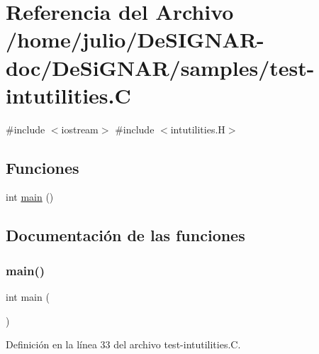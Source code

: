 \hypertarget{test-intutilities_8_c}{}\section{Referencia del Archivo /home/julio/\+De\+S\+I\+G\+N\+A\+R-\/doc/\+De\+Si\+G\+N\+A\+R/samples/test-\/intutilities.C}
\label{test-intutilities_8_c}
{\ttfamily \#include $<$iostream$>$}\newline
{\ttfamily \#include $<$intutilities.\+H$>$}\newline
\subsection*{Funciones}
\begin{DoxyCompactItemize}
\item 
int \hyperlink{test-intutilities_8_c_ae66f6b31b5ad750f1fe042a706a4e3d4}{main} ()
\end{DoxyCompactItemize}


\subsection{Documentación de las funciones}
\mbox{\label{test-intutilities_8_c_ae66f6b31b5ad750f1fe042a706a4e3d4}} 
\subsubsection{\texorpdfstring{main()}{main()}}
{\footnotesize\ttfamily int main (\begin{DoxyParamCaption}{ }\end{DoxyParamCaption})}



Definición en la línea 33 del archivo test-\/intutilities.\+C.

